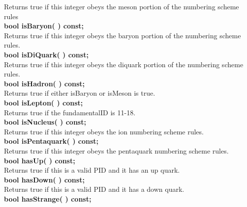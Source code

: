 \begin{tabbing}
\hspace{1.0in}  Returns true if this integer obeys the meson  portion of the numbering scheme rules\\
\hspace{0.5in}  {\bf bool isBaryon( )  const; }\\
\hspace{1.0in}  Returns true if this integer obeys the baryon portion of the numbering scheme rules.\\
\hspace{0.5in}  {\bf bool isDiQuark( ) const; }\\
\hspace{1.0in}  Returns true if this integer obeys the diquark portion of the numbering scheme rules.\\
\hspace{0.5in}  {\bf bool isHadron( )  const; }\\
\hspace{1.0in}  Returns true if either isBaryon or isMeson is true. \\
\hspace{0.5in}  {\bf bool isLepton( )  const; }\\
\hspace{1.0in}  Returns true if the fundamentalID is 11-18. \\
\hspace{0.5in}  {\bf bool isNucleus( )  const; }\\
\hspace{1.0in}  Returns true if this integer obeys the ion numbering scheme rules. \\
\hspace{0.5in}  {\bf bool isPentaquark( )  const; }\\
\hspace{1.0in}  Returns true if this integer obeys the pentaquark numbering scheme rules. \\
\hspace{0.5in}  {\bf bool hasUp( )      const; }\\
\hspace{1.0in}  Returns true if this is a valid PID and it has an up quark. \\
\hspace{0.5in}  {\bf bool hasDown( )    const; }\\
\hspace{1.0in}  Returns true if this is a valid PID and it has a down quark.\\
\hspace{0.5in}  {\bf bool hasStrange( ) const; }\\

\end{tabbing}
